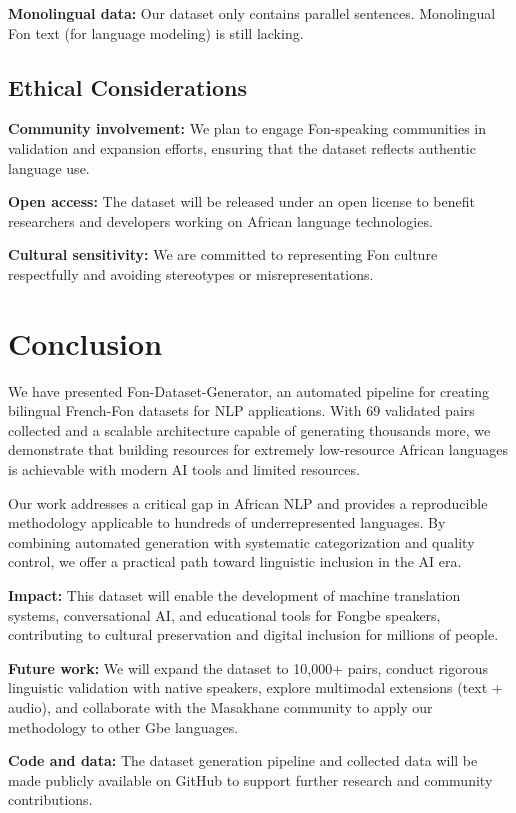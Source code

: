 \documentclass[10pt,twocolumn]{article}
\begin{document}
\textbf{Monolingual data:} Our dataset only contains parallel sentences. Monolingual Fon text (for language modeling) is still lacking.

\subsection{Ethical Considerations}

\textbf{Community involvement:} We plan to engage Fon-speaking communities in validation and expansion efforts, ensuring that the dataset reflects authentic language use.

\textbf{Open access:} The dataset will be released under an open license to benefit researchers and developers working on African language technologies.

\textbf{Cultural sensitivity:} We are committed to representing Fon culture respectfully and avoiding stereotypes or misrepresentations.

\section{Conclusion}

We have presented Fon-Dataset-Generator, an automated pipeline for creating bilingual French-Fon datasets for NLP applications. With 69 validated pairs collected and a scalable architecture capable of generating thousands more, we demonstrate that building resources for extremely low-resource African languages is achievable with modern AI tools and limited resources.

Our work addresses a critical gap in African NLP and provides a reproducible methodology applicable to hundreds of underrepresented languages. By combining automated generation with systematic categorization and quality control, we offer a practical path toward linguistic inclusion in the AI era.

\textbf{Impact:} This dataset will enable the development of machine translation systems, conversational AI, and educational tools for Fongbe speakers, contributing to cultural preservation and digital inclusion for millions of people.

\textbf{Future work:} We will expand the dataset to 10,000+ pairs, conduct rigorous linguistic validation with native speakers, explore multimodal extensions (text + audio), and collaborate with the Masakhane community to apply our methodology to other Gbe languages.

\textbf{Code and data:} The dataset generation pipeline and collected data will be made publicly available on GitHub to support further research and community contributions.
\end{document}

